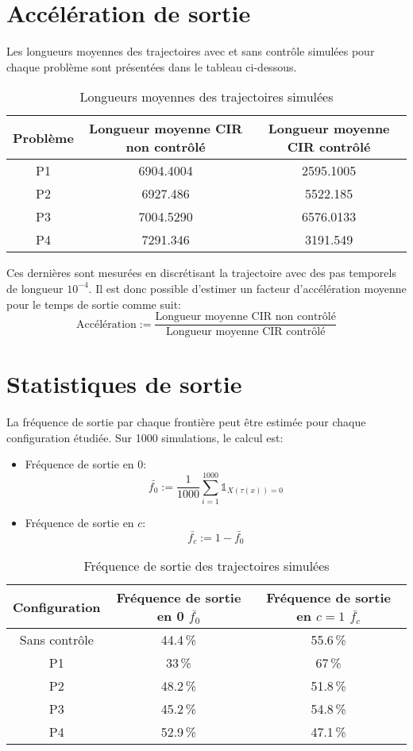 \section*{Accélération de sortie}
Les longueurs moyennes des trajectoires avec et sans contrôle simulées pour chaque problème sont présentées dans le tableau ci-dessous.
\begin{table}[htb]
        \centering
        \caption{Longueurs moyennes des trajectoires simulées}\label{tab:simulation_lengths}
        \renewcommand{\arraystretch}{1.4}
        \begin{tabular}{||c|c|c||}
        \hline
        Problème &
        Longueur moyenne CIR non contrôlé &
        Longueur moyenne CIR contrôlé \\
        \hline\hline
        P1 & 6904.4004 & 2595.1005 \\
        P2 & 6927.486 & 5522.185 \\
        P3 & 7004.5290 & 6576.0133 \\
        P4 & 7291.346 & 3191.549 \\
        \hline
        \end{tabular}
\end{table}\FloatBarrier Ces dernières sont mesurées en discrétisant la trajectoire avec des pas temporels de longueur $10^{-4}$. Il est donc possible d'estimer un facteur d'accélération moyenne pour le temps de sortie comme suit: 
\[
\text{Accélération}:=\frac{\text{Longueur moyenne CIR non contrôlé}}{\text{Longueur moyenne CIR contrôlé}}
\]
\pagebreak
\section*{Statistiques de sortie}
La fréquence de sortie par chaque frontière peut être estimée pour chaque configuration étudiée. Sur 1000 simulations, le calcul est:
\begin{itemize}
    \item Fréquence de sortie en 0:
    \[\bar{f_0}:=\frac{1}{1000}\sum_{i=1}^{1000}\mathds{1}_{X(\tau(x))=0}\]
    \item Fréquence de sortie en $c$:
    \[\bar{f_c}:=1-\bar{f_0}\]
\end{itemize}
\begin{table}[htb]
    \centering
    \caption{Fréquence de sortie des trajectoires simulées}\label{tab:simulation_exit_frequency}
    \renewcommand{\arraystretch}{1.4}
    \begin{tabular}{||c|c|c||}
        \hline
        Configuration & Fréquence de sortie en 0 $\bar{f_0}$ & Fréquence de sortie en $c=1$ $\bar{f_c}$ \\
        \hline\hline
        Sans contrôle & 44.4\,\% & 55.6\,\% \\
        P1 & 33\,\% & 67\,\% \\
        P2 & 48.2\,\% & 51.8\,\% \\
        P3 & 45.2\,\% & 54.8\,\% \\
        P4 & 52.9\,\% & 47.1\,\% \\
        \hline
    \end{tabular}
\end{table}